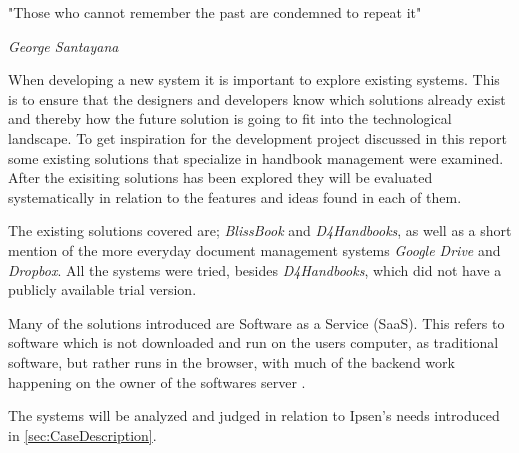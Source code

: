 \documentclass[../../master.tex]{subfiles}
\begin{document}
\epigraph{"Those who cannot remember the past are condemned to repeat it"}{\textit{George Santayana}}
When developing a new system it is important to explore existing systems.
This is to ensure that the designers and developers know which solutions already exist and thereby how the future solution is going to fit into the technological landscape.
To get inspiration for the development project discussed in this report some existing solutions that specialize in handbook management were examined.
After the exisiting solutions has been explored they will be evaluated systematically in relation to the features and ideas found in each of them.

The existing solutions covered are; \textit{BlissBook} and \textit{D4Handbooks}, as well as a short mention of the more everyday document management systems \textit{Google Drive} and \textit{Dropbox}.
All the systems were tried, besides \textit{D4Handbooks}, which did not have a publicly available trial version.

Many of the solutions introduced are Software as a Service (SaaS).
This refers to software which is not downloaded and run on the users computer, as traditional software, but rather runs in the browser, with much of the backend work happening on the owner of the softwares server \cite{saas}.

The systems will be analyzed and judged in relation to Ipsen's needs introduced in \cref{sec:CaseDescription}.
\end{document}
